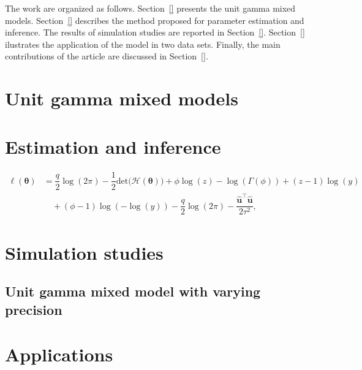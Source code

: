 \documentclass[a4paper,12pt]{article}
\begin{document}
The work are organized as follows. Section~\ref{} presents the unit
gamma mixed models. Section~\ref{} describes the method proposed for
parameter estimation and inference. The results of simulation studies
are reported in Section~\ref{}. Section~\ref{} ilustrates the
application of the model in two data sets. Finally, the main
contributions of the article are discussed in Section~\ref{}.


\section{Unit gamma mixed models}
\label{mixedmodel}

\section{Estimation and inference}
\label{inference}

\begin{fleqn}[\parindent]
\begin{equation}
\begin{split}
\label{eq:LAlogLik}
\ell(\boldsymbol{\theta}) & = \dfrac{q}{2} \log(2 \pi) - \dfrac{1}{2} \mathrm{det}\big( \mathcal{H}(\boldsymbol{\theta})\big) + \phi \log(z) - \log(\Gamma(\phi)) + (z - 1) \log(y) \nonumber \\
                          & \quad + (\phi - 1) \log( - \log(y)) - \dfrac{q}{2} \log(2 \pi) - \dfrac{ \hat{\mathbf{u}}^{\top}\hat{\mathbf{u}} }{2\tau^2},
\end{split}
\end{equation}
\end{fleqn}

\section{Simulation studies}
\label{simulation}

\subsection{Unit gamma mixed model with varying precision}
\label{simul3}

\section{Applications}
\label{results}
\end{document}
